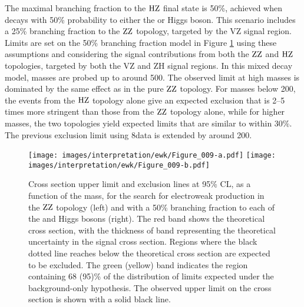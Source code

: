 The maximal branching fraction to the $\mathrm{H}\mathrm{Z}$ final state is 50\%, achieved when \firstchi decays with 50\% probability to either the \PZ or Higgs boson.
This scenario includes a 25\% branching fraction to the $\mathrm{Z}\mathrm{Z}$ topology, targeted by the VZ signal region.
Limits are set on the 50\% branching fraction model in Figure \ref{fig:LimitTChiZZHZ} using these assumptions and considering the signal contributions from both the $\mathrm{Z}\mathrm{Z}$ and $\mathrm{H}\mathrm{Z}$ topologies, targeted by both the VZ and ZH signal regions.
In this mixed decay model, \firstchi masses are probed up to around 500\GeV.
The observed limit at high masses is dominated by the same effect as in the pure $\mathrm{Z}\mathrm{Z}$ topology.
For masses below 200\GeV, the events from the $\mathrm{H}\mathrm{Z}$ topology alone give an expected exclusion that is 2--5 times more stringent than those from the $\mathrm{Z}\mathrm{Z}$ topology alone, while for higher masses, the two topologies yield expected limits that are similar to within 30\%.
The previous exclusion limit using 8\TeV data is extended by around 200\GeV.
\begin{figure}
\centering
\texttt{[image: images/interpretation/ewk/Figure\_009-a.pdf]}
\texttt{[image: images/interpretation/ewk/Figure\_009-b.pdf]}
\caption{Cross section upper limit and exclusion lines at 95\% CL, as a function of the \firstchi mass, for the search for electroweak production in the $\mathrm{Z}\mathrm{Z}$ topology (left)
  and with a 50\% branching fraction to each of the \PZ and Higgs bosons (right).
The red band shows the theoretical cross section, with the thickness of band representing the theoretical uncertainty in the signal cross section.
Regions where the black dotted line reaches below the theoretical cross section are expected to be excluded.
The green (yellow) band indicates the region containing 68 (95)\% of the distribution of limits expected under the background-only hypothesis.
The observed upper limit on the cross section is shown with a solid black line.
}
\label{fig:LimitTChiZZHZ}
\end{figure}
